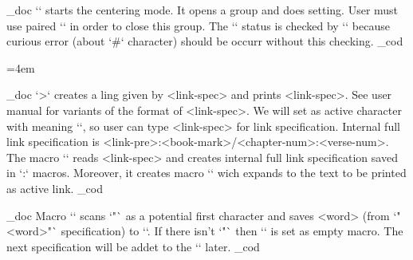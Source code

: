 \let\FormatedBook=\CommentedBook
\def\fmtpre#1#2{\newaction{\gentovref{#1}}{\addto\tmpc{#2}}}
\def\fmtadd#1#2{\newaction{\gentovref{#1}}{\addto\tmpb{#2}}}
\def\fmtins#1#2#3{\newaction{\gentovref{#1}}{\replpre{\fmtafter{#3}}{#2}{\fmtfail{#3}}}}
\def\fmtafter#1#2{#2#1}
\def\fmtfail#1{\fmtwarn\addto\tmpc{#1}}
\def\fmtwarn{\printwarn{\string\fmtins: \currverse: The text "\unexpanded\ea{\text}" not found}}

   \_doc
   `\begcenter` starts the centering mode. It opens a group and does
   setting. User must use paired `\endcenter` in order to close this group.
   The `\centeringmode` status is checked by `\encenter` because curious error
   (about `#` character) should be occurr without this checking.
   \_cod

\newdimen\centermargin \centermargin=4em
\def\begcenter{\par \medskip
   \bgroup
   \def\centeringmode{y}
   \parindent=0pt
   \leftskip=\centermargin plus1fill
   \rightskip=\leftskip
}
\def\endcenter{\par
   \ifx\centeringmode\undefined
      \printwarn{\noexpand\endcenter ignored: no \noexpand\begcenter precedes}
   \else \egroup \medskip \fi}


   \_doc
   `>` creates a ling given by <link-spec> and prints
   <link-spec>. See user manual for variants of the format of <link-spec>.
   We will set \code{\<} as active character with meaning `\bref`, so
   user can type \code{\<}<link-spec>\code{\>} for link specification.\nl
   Internal full link specification is <link-pre>:<book-mark>/<chapter-num>:<verse-num>.
   The macro `\bref` reads <link-spec> and creates internal full link
   specification saved in `\linkpe:\linkfspec` macros. Moreover, it creates
   macro `\linktext` wich expands to the text to be printed as active link.\nl
   \_cod

\def\bref {\futurelet\next\brefC}

   \_doc
   Macro `\brefC` scans `"` as a potential first character and
   saves <word> (from `"<word>"` specification) to `\linktext`.
   If there isn't `"` then `\linktext` is set as empty macro. 
   The next specification will be addet to the `\linktex` later.
   \_cod

\def\brefB {\futurelet\next\brefC}
\def\brefC {\ifx\next"\def\nextdo"##1"{\def\linktext{##1}\brefD}%
            \else \def\linktext{}\def\nextdo{\brefD}%
            \fi \nextdo
}

